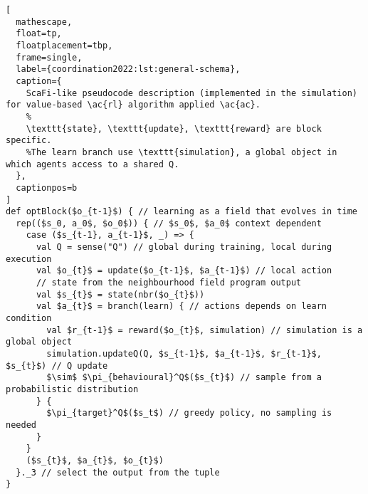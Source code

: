 
\begin{lstlisting}[
  mathescape,
  float=tp,
  floatplacement=tbp,
  frame=single,
  label={coordination2022:lst:general-schema},
  caption={
    ScaFi-like pseudocode description (implemented in the simulation) for value-based \ac{rl} algorithm applied \ac{ac}.
    %
    \texttt{state}, \texttt{update}, \texttt{reward} are block specific. 
    %The learn branch use \texttt{simulation}, a global object in which agents access to a shared Q.
  },
  captionpos=b
]
def optBlock($o_{t-1}$) { // learning as a field that evolves in time
  rep(($s_0, a_0$, $o_0$)) { // $s_0$, $a_0$ context dependent 
    case ($s_{t-1}, a_{t-1}$, _) => {
      val Q = sense("Q") // global during training, local during execution
      val $o_{t}$ = update($o_{t-1}$, $a_{t-1}$) // local action
      // state from the neighbourhood field program output
      val $s_{t}$ = state(nbr($o_{t}$))
      val $a_{t}$ = branch(learn) { // actions depends on learn condition
        val $r_{t-1}$ = reward($o_{t}$, simulation) // simulation is a global object
        simulation.updateQ(Q, $s_{t-1}$, $a_{t-1}$, $r_{t-1}$, $s_{t}$) // Q update
        $\sim$ $\pi_{behavioural}^Q$($s_{t}$) // sample from a probabilistic distribution
      } {
        $\pi_{target}^Q$($s_t$) // greedy policy, no sampling is needed
      }
    }
    ($s_{t}$, $a_{t}$, $o_{t}$) 
  }._3 // select the output from the tuple
}
  \end{lstlisting}
